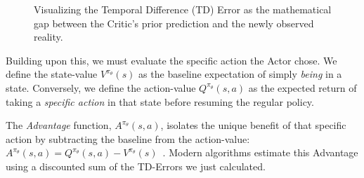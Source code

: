 \begin{figure}[H]
\centering
{}
\caption[Visualizing the Temporal Difference (TD) Error]{Visualizing the Temporal Difference (TD) Error as the mathematical gap between the Critic's prior prediction and the newly observed reality.}
\label{fig:td_error_visual}
\end{figure}

Building upon this, we must evaluate the specific action the Actor chose. We define the state-value $V^{\pi_\theta}(s)$ as the baseline expectation of simply \emph{being} in a state. Conversely, we define the action-value $Q^{\pi_\theta}(s, a)$ as the expected return of taking a \emph{specific action} in that state before resuming the regular policy.

The \emph{Advantage} function, $A^{\pi_\theta}(s, a)$, isolates the unique benefit of that specific action by subtracting the baseline from the action-value: $A^{\pi_\theta}(s, a) = Q^{\pi_\theta}(s, a) - V^{\pi_\theta}(s)$~\parencite{Sutton_Barto_2018}. Modern algorithms estimate this Advantage using a discounted sum of the TD-Errors we just calculated.

